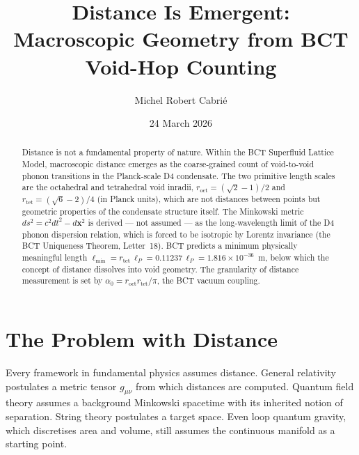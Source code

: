 \documentclass[aps,prl,twocolumn,showpacs,preprintnumbers]{revtex4-2}
\newcommand{\roct}{r_{\mathrm{oct}}}
\newcommand{\rtet}{r_{\mathrm{tet}}}
\newcommand{\azero}{\alpha_0}
\newcommand{\lP}{\ell_P}
\begin{document}

\title{Distance Is Emergent:\\
Macroscopic Geometry from BCT Void-Hop Counting}

\author{Michel Robert Cabri\'e}

\date{24 March 2026}

\begin{abstract}
Distance is not a fundamental property of nature. Within the BCT
Superfluid Lattice Model, macroscopic distance emerges as the
coarse-grained count of void-to-void phonon transitions in the
Planck-scale D4 condensate. The two primitive length scales are
the octahedral and tetrahedral void inradii,
$\roct = (\sqrt{2}-1)/2$ and $\rtet = (\sqrt{6}-2)/4$ (in Planck
units), which are not distances between points but geometric
properties of the condensate structure itself. The Minkowski metric
$ds^2 = c^2dt^2 - d\mathbf{x}^2$ is derived --- not assumed ---
as the long-wavelength limit of the D4 phonon dispersion relation,
which is forced to be isotropic by Lorentz invariance
(the BCT Uniqueness Theorem, Letter~18). BCT predicts a minimum
physically meaningful length $\ell_{\min} = \rtet\,\lP =
0.11237\,\lP = 1.816\times10^{-36}$~m, below which the concept
of distance dissolves into void geometry. The granularity of
distance measurement is set by $\azero = \roct\rtet/\pi$,
the BCT vacuum coupling.
\end{abstract}

\maketitle

\section{The Problem with Distance}

Every framework in fundamental physics assumes distance.
General relativity postulates a metric tensor $g_{\mu\nu}$
from which distances are computed. Quantum field theory assumes
a background Minkowski spacetime with its inherited notion of
separation. String theory postulates a target space.
Even loop quantum gravity, which discretises area and volume,
still assumes the continuous manifold as a starting point.
\end{document}
